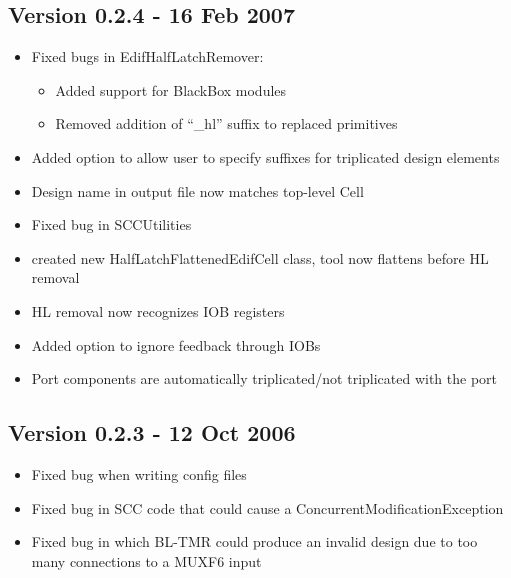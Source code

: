 \documentclass[english]{article}
\begin{document}
\subsection*{Version 0.2.4 - 16 Feb 2007}
\begin{itemize}
\item Fixed bugs in EdifHalfLatchRemover: 
\begin{itemize}
\item Added support for BlackBox modules
\item Removed addition of ``\_hl'' suffix to replaced primitives
\end{itemize}
\item Added option to allow user to specify suffixes for triplicated design
elements
\item Design name in output file now matches top-level Cell
\item Fixed bug in SCCUtilities
\item created new HalfLatchFlattenedEdifCell class, tool now flattens before HL
removal
\item HL removal now recognizes IOB registers
\item Added option to ignore feedback through IOBs
\item Port components are automatically triplicated/not triplicated with the port
\end{itemize}

\subsection*{Version 0.2.3 - 12 Oct 2006}
\begin{itemize}
\item Fixed bug when writing config files
\item Fixed bug in SCC code that could cause a ConcurrentModificationException
\item Fixed bug in which BL-TMR could produce an invalid design due to too many
  connections to a MUXF6 input
\end{itemize}
\end{document}
